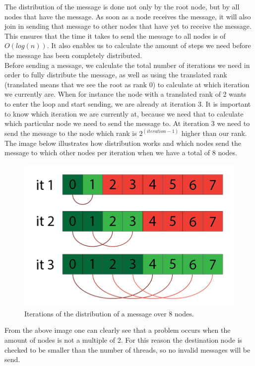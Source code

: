\documentclass[a4paper,12px]{article}
\begin{document}
The distribution of the message is done not only by the root node, but by all
nodes that have the message. As soon as a node receives the message, it will
also join in sending that message to other nodes that have yet to receive the
message. This ensures that the time it takes to send the message to all nodes is
of $O(log(n))$. It also enables us to calculate the amount of steps we need
before the message has been completely distributed. \\

Before sending a message, we calculate the total number of iterations we need in
order to fully distribute the message, as well as using the translated rank
(translated means that we see the root as rank 0) to calculate at which
iteration we currently are. When for instance the node with a translated rank of
2 wants to enter the loop and start sending, we are already at iteration 3. It
is important to know which iteration we are currently at, because we need that
to calculate which particular node we need to send the message to. At iteration
3 we need to send the message to the node which rank is $2^{(iteration-1)}$
higher than our rank.\\

The image below illustrates how distribution works and which nodes send the
message to which other nodes per iteration when we have a total of 8 nodes.

\begin{figure}[H]
    \centering
    \includegraphics[width=\textwidth]{distribution}
    \caption{Iterations of the distribution of a message over 8 nodes.}
\end{figure}

From the above image one can clearly see that a problem occurs when the amount
of nodes is not a multiple of 2. For this reason the destination node is checked
to be smaller than the number of threads, so no invalid messages will be send.
\end{document}
